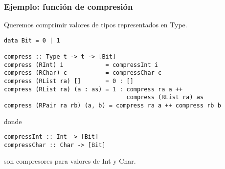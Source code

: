 \documentclass{article}
\newcommand{\imp}[1]{\textcolor{color1}{#1}}
\begin{document}
\subsubsection{Ejemplo: función de compresión}

Queremos comprimir valores de tipos representados en Type.
\begin{lstlisting}
data Bit = 0 | 1

compress :: Type t -> t -> [Bit]
compress (RInt) i            = compressInt i
compress (RChar) c           = compressChar c
compress (RList ra) []       = 0 : []
compress (RList ra) (a : as) = 1 : compress ra a ++ 
                                   compress (RList ra) as
compress (RPair ra rb) (a, b) = compress ra a ++ compress rb b
\end{lstlisting}
\indent \indent donde
\begin{lstlisting}
compressInt :: Int -> [Bit]
compressChar :: Char -> [Bit]
\end{lstlisting}

son compresores para valores de \imp{Int} y \imp{Char}.
\end{document}
